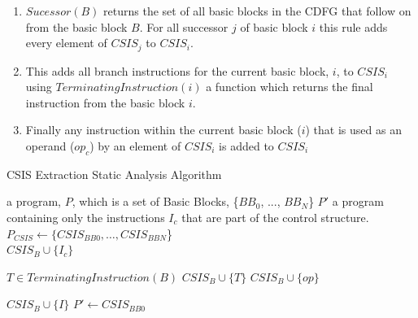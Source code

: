\begin{enumerate}
    \setlength{\itemsep}{3pt}
    \setlength{\parskip}{0pt}
    \setlength{\parsep}{0pt}
    \item $Sucessor(B)$ returns the set of all basic blocks in the CDFG that follow on from the basic block $B$.
	  For all successor  $j$ of basic block $i$ this rule adds every element of $CSIS_j$ to $CSIS_i$.
    \item This adds all branch instructions for the current basic block, $i$, to $CSIS_i$ using
	  $TerminatingInstruction(i)$ a function which returns the final instruction from the basic block $i$.
    \item Finally any instruction within the current basic block ($i$) that is used as an operand ($op_{c}$) by an element of $CSIS_i$ is added to $CSIS_i$
\end{enumerate}
\vspace{-4pt}

\begin{algorithm}[t]
\caption{CSIS Extraction Static Analysis Algorithm
\label{alg:CSIS-extraction}}
    \begin{algorithmic}[1]
        \INPUT a program, $P$, which is a set of Basic Blocks, \{$BB_0$, ..., $BB_N$\}
        \OUTPUT $P'$ a program containing only the instructions $I_c$ that are part of the control structure.
        \Statex
            \State $P_{CSIS} \gets \{CSIS_{BB0}, \dots,  CSIS_{BBN}$\}
                \\\hrulefill
                        \State $CSIS_B \cup \{I_{c}\}$
                    \EndFor
                \EndFor
                \\\hrulefill

                \State $T \in TerminatingInstruction(B)$
                \State $CSIS_{B} \cup \{T\}$
                    \State $CSIS_{B} \cup \{op\}$
                \EndFor
                \\\hrulefill

                                \State $CSIS_{B} \cup \{I\}$
                            \EndIf
                        \EndFor
                    \EndFor
                \EndFor
            \EndFor
	\State $P' \gets CSIS_{BB0}$
        \EndWhile
    \end{algorithmic}
\end{algorithm}

